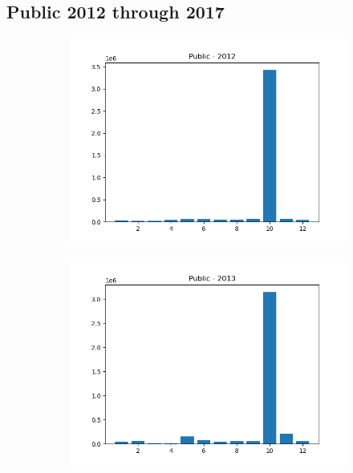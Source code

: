 \documentclass{article}
\begin{document}
\subsection*{Public 2012 through 2017}
\begin{figure}[H]
    \begin{subfigure}{.5\textwidth}
        \centering
        \includegraphics[width=\textwidth]{../../output/figures/annual_source_distribution/Public_data_dist_2012.png}
    \end{subfigure}
    \begin{subfigure}{.5\textwidth}
        \centering
        \includegraphics[width=\textwidth]{../../output/figures/annual_source_distribution/Public_data_dist_2013.png}

\end{subfigure}
\end{figure}
\end{document}
